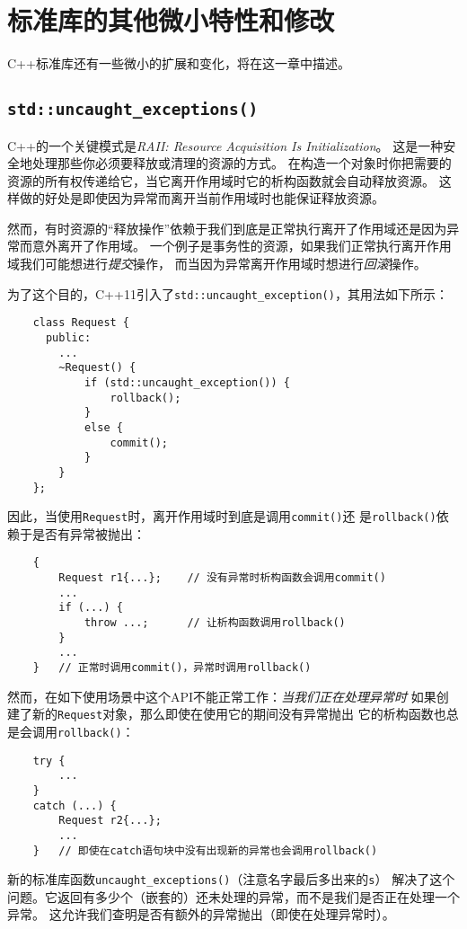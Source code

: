 \chapter{标准库的其他微小特性和修改}\label{ch28}
C++标准库还有一些微小的扩展和变化，将在这一章中描述。


\section{\texttt{std::uncaught\_exceptions()}}\label{ch28.1}
C++的一个关键模式是\emph{RAII: Resource Acquisition Is Initialization}。
这是一种安全地处理那些你必须要释放或清理的资源的方式。
在构造一个对象时你把需要的资源的所有权传递给它，当它离开作用域时它的析构函数就会自动释放资源。
这样做的好处是即使因为异常而离开当前作用域时也能保证释放资源。

然而，有时资源的“释放操作”依赖于我们到底是正常执行离开了作用域还是因为异常而意外离开了作用域。
一个例子是事务性的资源，如果我们正常执行离开作用域我们可能想进行\emph{提交}操作，
而当因为异常离开作用域时想进行\emph{回滚}操作。

为了这个目的，C++11引入了\texttt{std::uncaught\_exception()}，其用法如下所示：
\begin{lstlisting}
    class Request {
      public:
        ...
        ~Request() {
            if (std::uncaught_exception()) {
                rollback();
            }
            else {
                commit();
            }
        }
    };
\end{lstlisting}
因此，当使用\texttt{Request}时，离开作用域时到底是调用\texttt{commit()}还
是\texttt{rollback()}依赖于是否有异常被抛出：
\begin{lstlisting}
    {
        Request r1{...};    // 没有异常时析构函数会调用commit()
        ...
        if (...) {
            throw ...;      // 让析构函数调用rollback()
        }
        ...
    }   // 正常时调用commit()，异常时调用rollback()
\end{lstlisting}
然而，在如下使用场景中这个API不能正常工作：\emph{当我们正在处理异常时}
如果创建了新的\texttt{Request}对象，那么即使在使用它的期间没有异常抛出
它的析构函数也总是会调用\texttt{rollback()}：
\begin{lstlisting}
    try {
        ...
    }
    catch (...) {
        Request r2{...};
        ...
    }   // 即使在catch语句块中没有出现新的异常也会调用rollback()
\end{lstlisting}
新的标准库函数\texttt{uncaught\_exceptions()}（注意名字最后多出来的\texttt{s}）
解决了这个问题。它返回有多少个（嵌套的）还未处理的异常，而不是我们是否正在处理一个异常。
这允许我们查明是否有额外的异常抛出（即使在处理异常时）。

